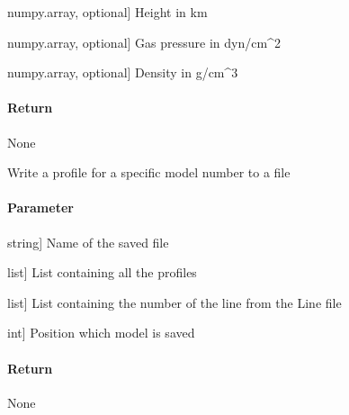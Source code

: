 \documentclass[letterpaper,10pt,english]{sphinxmanual}
\begin{document}
\begin{fulllineitems}
\begin{description}
\sphinxlineitem{z}{[}numpy.array, optional{]}
\sphinxAtStartPar
Height in km

\sphinxlineitem{Pg}{[}numpy.array, optional{]}
\sphinxAtStartPar
Gas pressure in dyn/cm\textasciicircum{}2

\sphinxlineitem{rho}{[}numpy.array, optional{]}
\sphinxAtStartPar
Density in g/cm\textasciicircum{}3

\end{description}


\paragraph{Return}
\label{\detokenize{functions:id27}}
\sphinxAtStartPar
None

\end{fulllineitems}


\begin{fulllineitems}
\label{\detokenize{functions:sir.write_profile}}
\pysigstartsignatures
{}
\pysigstopsignatures
\sphinxAtStartPar
Write a profile for a specific model number to a file


\paragraph{Parameter}
\label{\detokenize{functions:id28}}\begin{description}
\sphinxlineitem{filename}{[}string{]}
\sphinxAtStartPar
Name of the saved file

\sphinxlineitem{profiles}{[}list{]}
\sphinxAtStartPar
List containing all the profiles

\sphinxlineitem{atoms}{[}list{]}
\sphinxAtStartPar
List containing the number of the line from the Line file

\sphinxlineitem{pos}{[}int{]}
\sphinxAtStartPar
Position which model is saved

\end{description}


\paragraph{Return}
\label{\detokenize{functions:id29}}
\sphinxAtStartPar
None

\end{fulllineitems}
\end{document}
